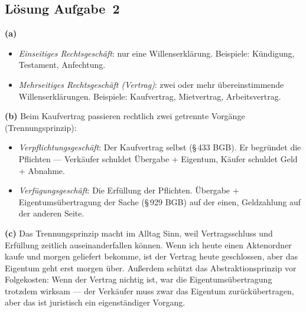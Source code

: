 \documentclass[11pt, a4paper]{article}
\begin{document}
\subsection*{Lösung Aufgabe~2}
\begin{loesung}
\textbf{(a)}
\begin{itemize}[itemsep=0pt]
  \item \emph{Einseitiges Rechtsgeschäft}: nur eine Willenserklärung. Beispiele: Kündigung, Testament, Anfechtung.
  \item \emph{Mehrseitiges Rechtsgeschäft (Vertrag)}: zwei oder mehr übereinstimmende Willenserklärungen. Beispiele: Kaufvertrag, Mietvertrag, Arbeitsvertrag.
\end{itemize}

\textbf{(b)} Beim Kaufvertrag passieren rechtlich zwei getrennte Vorgänge (Trennungsprinzip):
\begin{itemize}[itemsep=0pt]
  \item \emph{Verpflichtungsgeschäft}: Der Kaufvertrag selbst (§\,433 BGB). Er begründet die Pflichten --- Verkäufer schuldet Übergabe + Eigentum, Käufer schuldet Geld + Abnahme.
  \item \emph{Verfügungsgeschäft}: Die Erfüllung der Pflichten. Übergabe + Eigentumsübertragung der Sache (§\,929 BGB) auf der einen, Geldzahlung auf der anderen Seite.
\end{itemize}

\textbf{(c)} Das Trennungsprinzip macht im Alltag Sinn, weil Vertragsschluss und Erfüllung
zeitlich auseinanderfallen können. Wenn ich heute einen Aktenordner kaufe und morgen
geliefert bekomme, ist der Vertrag heute geschlossen, aber das Eigentum geht erst morgen
über. Außerdem schützt das Abstraktionsprinzip vor Folgekosten: Wenn der Vertrag
nichtig ist, war die Eigentumsübertragung trotzdem wirksam --- der Verkäufer muss
zwar das Eigentum zurückübertragen, aber das ist juristisch ein eigenständiger
Vorgang.
\end{loesung}
\end{document}
